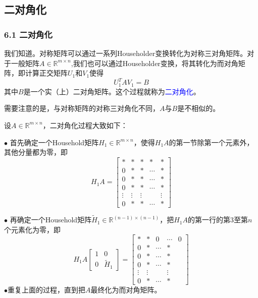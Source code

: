 \documentclass[notheorems,serif]{beamer}
\begin{document}
\subsection*{二对角化}
\begin{frame}
\frametitle{6.1 \qquad 二对角化}


我们知道。对称矩阵可以通过一系列Householder变换转化为对称三对角矩阵。对于一般矩阵$A \in \mathbb{R}^{m \times n}$,我们也可以通过Householder变换，将其转化为而对角矩阵，即计算正交矩阵$U_1$和$V_1$使得
\begin{equation}
U_1^TAV_1=B
\label{equation5.8}
\end{equation}
其中$B$是一个实（上）二对角矩阵。这个过程就称为\textcolor{blue}{二对角化}。

需要注意的是，与对称矩阵的对称三对角化不同，$A$与$B$是不相似的。
\end{frame}
\begin{frame}

设$A \in \mathbb{R}^{m \times n}$，二对角化过程大致如下：

	$\bullet$ 首先确定一个Household矩阵$H_1 \in \mathbb{R}^{m \times n}$，使得$H_1A$的第一节除第一个元素外，其他分量都为零，即$$H_1A=\left[\begin{array}{ccccc}{*} & {*} & {*} & {*} & {*} \\ {0} & {*} & {*} & {\cdots} & {*} \\ {0} & {*} & {*} & {\cdots} & {*} \\ {0} & {*} & {*} & {\cdots} & {*} \\ {\vdots} & {\vdots} & {\vdots} & {} & {\vdots} \\ {0} & {*} & {*} & {\cdots} & {*}\end{array}\right]$$
\end{frame}
\begin{frame}
	$\bullet$ 再确定一个Household矩阵$\tilde{H}_{1} \in \mathbb{R}^{(n-1) \times(n-1)}$，把$H_1A$的第一行的第$3$至第$n$个元素化为零，即$$
	H_{1} A\left[\begin{array}{cc}{1} & {0} \\ {0} & {\tilde{H}_{1}}\end{array}\right]=\left[\begin{array}{ccccc}{*} & {*} & {0} & {\cdots} & {0} \\ {0} & {*} & {\cdots} & {*} \\ {0} & {*} & {\cdots} & {*} \\ {0} & {*} & {\cdots} & {*} \\ {\vdots} & {\vdots} & {} & {\vdots} \\ {0} & {*} & {\cdots} & {*}\end{array}\right]
	$$
	$\bullet$重复上面的过程，直到把$A$最终化为而对角矩阵。
\end{frame}
\end{document}

